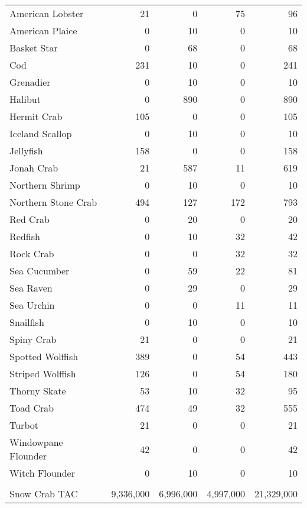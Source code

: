 \documentclass[11pt]{article}
\begin{document}
\begin{table}
\begin{center}
\begin{tabular}{lrrrr}
American Lobster  &  21  & 0  & 75  & 96  \\
American Plaice  & 0  & 10  & 0  & 10  \\
Basket Star  & 0  & 68  & 0  & 68  \\
Cod  & 231  & 10  & 0  & 241  \\
Grenadier  & 0  & 10  & 0  & 10  \\
Halibut  & 0  & 890  & 0  & 890  \\
Hermit Crab  & 105  & 0  & 0  & 105  \\
Iceland Scallop  & 0  & 10  & 0  & 10  \\
Jellyfish  & 158  & 0  & 0  & 158  \\
Jonah Crab  & 21  & 587  & 11  & 619  \\
Northern Shrimp  & 0  & 10  & 0  & 10  \\
Northern Stone Crab  & 494  & 127  & 172  & 793  \\
Red Crab  & 0  & 20  & 0  & 20  \\
Redfish  & 0  & 10  & 32  & 42  \\
Rock Crab  & 0  & 0  & 32  & 32  \\
Sea Cucumber  & 0  & 59  & 22  & 81  \\
Sea Raven  & 0  & 29  & 0  & 29  \\
Sea Urchin  & 0  & 0  & 11  & 11  \\
Snailfish  & 0  & 10  & 0  & 10  \\
Spiny Crab  & 21  & 0  & 0  & 21  \\
Spotted Wolffish  & 389  & 0  & 54  & 443  \\
Striped Wolffish  & 126  & 0  & 54  & 180  \\
Thorny Skate  & 53  & 10  & 32  & 95  \\
Toad Crab  & 474  & 49  & 32  & 555  \\
Turbot  & 21  & 0  & 0  & 21  \\
Windowpane Flounder  & 42  & 0  & 0  & 42  \\
Witch Flounder  & 0  & 10  &  0  &10  \\
\\
Snow Crab TAC  & 9,336,000  & 6,996,000  & 4,997,000  & 21,329,000 \\

\hline
\end{tabular}
\end{center}
\end{table}
\end{document}
